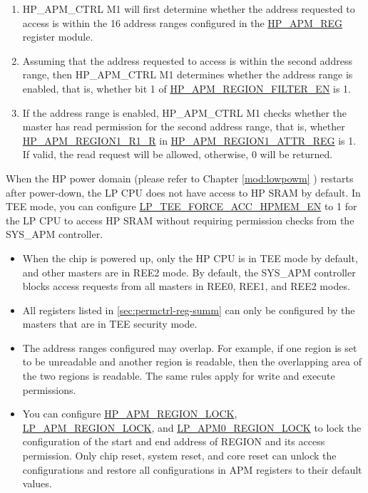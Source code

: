 \documentclass[main\_\_EN.tex]{subfiles}
\begin{document}
\begin{enumerate}
    \item HP\_APM\_CTRL M1 will first determine whether the address requested to access is within the 16 address ranges configured in the \hyperref[sec:permctrl-reg-hp]{HP\_APM\_REG} register module.

    \item Assuming that the address requested to access is within the second address range, then HP\_APM\_CTRL M1 determines whether the address range is enabled, that is, whether bit 1 of \hyperref[fielddesc:HPAPMREGIONFILTEREN]{HP\_APM\_REGION\_FILTER\_EN} is 1.

    \item If the address range is enabled, HP\_APM\_CTRL M1 checks whether the master has read permission for the second address range, that is, whether \hyperref[fielddesc:HPAPMREGIONNR1R]{HP\_APM\_REGION1\_R1\_R} in \hyperref[regdesc:HPAPMREGIONNATTRREG]{HP\_APM\_REGION1\_ATTR\_REG} is 1. If valid, the read request will be allowed, otherwise, 0 will be returned.
\end{enumerate}

When the HP power domain (please refer to Chapter \ref{mod:lowpowm} \textit{}) restarts after power-down, the LP CPU does not have access to HP SRAM by default. In TEE mode, you can configure \hyperref[fielddesc:LPTEEFORCEACCHPMEMEN]{LP\_TEE\_FORCE\_ACC\_HPMEM\_EN} to 1 for the LP CPU to access HP SRAM without requiring permission checks from the SYS\_APM controller.

\begin{tiplisting}
\vspace{-2em}
\begin{itemize}
    \item When the chip is powered up, only the HP CPU is in TEE mode by default, and other masters are in REE2 mode. By default, the SYS\_APM controller blocks access requests from all masters in REE0, REE1, and REE2 modes.

    \item All registers listed in \ref{sec:permctrl-reg-summ} \textit{} can only be configured by the masters that are in TEE security mode.

    \item The address ranges configured may overlap. For example, if one region is set to be unreadable and another region is readable, then the overlapping area of the two regions is readable. The same rules apply for write and execute permissions.

    \item You can configure \hyperref[fielddesc:HPAPMREGIONNLOCK]{HP\_APM\_REGION\_LOCK}, \hyperref[fielddesc:LPAPMREGIONNLOCK]{LP\_APM\_REGION\_LOCK}, and \hyperref[fielddesc:LPAPM0REGIONNLOCK]{LP\_APM0\_REGION\_LOCK} to lock the configuration of the start and end address of REGION and its access permission. Only chip reset, system reset, and core reset can unlock the configurations and restore all configurations in APM registers to their default values.
\end{itemize}
\end{tiplisting}
\end{document}
